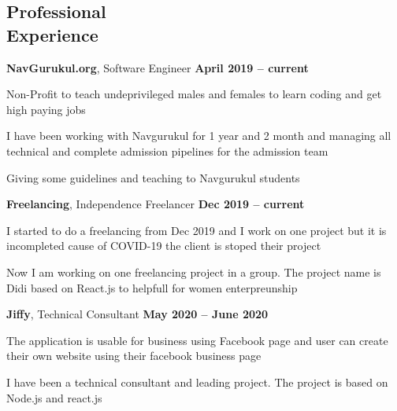 \documentclass[margin,line]{resume}
\begin{document}
\begin{resume}
    \section{\color{red} \mysidestyle Professional\\Experience}
    \textbf{NavGurukul.org}, Software Engineer \hfill \textbf{April 2019 -- current}
    \begin{list2}
        \item Non-Profit to teach undeprivileged males and females to learn coding and get high paying jobs
        \item I have been working with Navgurukul for 1 year and 2 month and managing all technical and complete admission pipelines for the admission team
        \item Giving some guidelines and teaching to Navgurukul students
    \end{list2}\vspace{-1.5mm}

    \textbf{Freelancing}, Independence Freelancer \hfill \textbf{Dec 2019 -- current}
    \begin{list2}
        \item I started to do a freelancing from Dec 2019 and I work on one project but it is incompleted cause of COVID-19 the client is stoped their project
        \item Now I am working on one freelancing project in a group. The project name is Didi based on React.js to helpfull for women enterpreunship
    \end{list2}\vspace{-1.5mm}

    \textbf{Jiffy}, Technical Consultant \hfill \textbf{May 2020 -- June 2020}
    \begin{list2}
        \item The application is usable for business using Facebook page and user can create their own website using their facebook business page
        \item I have been a technical consultant and leading project. The project is based on Node.js and react.js
    \end{list2}\vspace{-1.5mm}


\end{resume}
\end{document}
